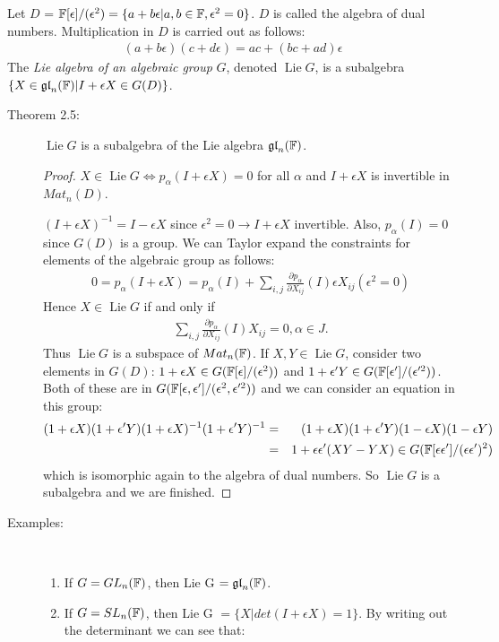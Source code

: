 \documentclass[aps,onecolumn,secnumarabic,nobalancelastpage,amsmath,amssymb]{revtex4}
\DeclareMathOperator{\Lie}{Lie}
\begin{document}
Let $D$ = $\mathbb{F}[\epsilon]/(\epsilon^2) = \{a + b\epsilon | a,b \in \mathbb{F}, \epsilon^2 = 0\}$. $D$ is called the algebra of dual numbers.  Multiplication in $D$ is carried out as follows:
\begin{align*}
(a + b\epsilon)(c + d\epsilon) = ac + (bc + ad)\epsilon
\end{align*}
The {\slshape Lie algebra of an algebraic group} $G$, denoted $\Lie G$, is a subalgebra $\{X \in \mathfrak{gl}_n(\mathbb{F}) | I + \epsilon X \in G(D)\}$.
\begin{description}
\item[Theorem 2.5:] $\Lie G$ is a subalgebra of the Lie algebra $\mathfrak{gl}_n(\mathbb{F})$. 
\begin{proof}
$X \in \Lie G \iff p_\alpha(I + \epsilon X) = 0$ for all $\alpha$ and $I + \epsilon X$ is invertible in $Mat_n(D)$.

$(I + \epsilon X)^{-1} = I - \epsilon X$ since $\epsilon^2 = 0 \rightarrow I + \epsilon X$ invertible.  Also, $p_\alpha(I) = 0$ since $G(D)$ is a group. We can Taylor expand the constraints for elements of the algebraic group as follows:
\begin{align*}
0 = p_\alpha(I + \epsilon X) = p_\alpha(I) + \sum_{i,j} \frac{\partial p_\alpha}{\partial X_{ij}}(I) \epsilon X_{ij} (\epsilon^2 = 0)
\end{align*}
Hence $X \in \Lie G$ if and only if
 \begin{align*}
 \sum_{i,j} \frac{\partial p_\alpha}{\partial X_{ij}}(I) X_{ij} = 0, \alpha \in J.
 \end{align*}
Thus $\Lie G$ is a subspace of $Mat_n(\mathbb{F})$.  If $X, Y \in \Lie G$, consider two elements in $G(D)$:  $1 + \epsilon X \in G(\mathbb{F}[\epsilon]/(\epsilon^2))$ and $1 + \epsilon' Y \in G(\mathbb{F}[\epsilon']/(\epsilon'^2))$.  Both of these are in $G(\mathbb{F}[\epsilon,\epsilon']/(\epsilon^2,\epsilon'^2))$ and we can consider an equation in this group:
 \begin{align*}
 (1 + \epsilon X)(1 + \epsilon' Y)(1 + \epsilon X)^{-1}(1 + \epsilon' Y)^{-1} & = & (1 + \epsilon X)(1 + \epsilon' Y)(1 - \epsilon X)(1 - \epsilon Y) \\
 & = & 1 + \epsilon \epsilon' (X Y - Y X) \in G(\mathbb{F}[\epsilon\epsilon']/(\epsilon\epsilon')^2)
 \end{align*}
which is isomorphic again to the algebra of dual numbers. So $\Lie G$ is a subalgebra and we are finished.
\end{proof}
\item[Examples:]\ 

\begin{enumerate}
\item If $G = GL_n(\mathbb{F})$, then Lie G $= \mathfrak{gl}_n(\mathbb{F})$.
\item If $G = SL_n(\mathbb{F})$, then Lie G $= \{ X | det(I + \epsilon X) = 1\}$.  By writing out the determinant we can see that:


\end{enumerate}
\end{description}
\end{document}
